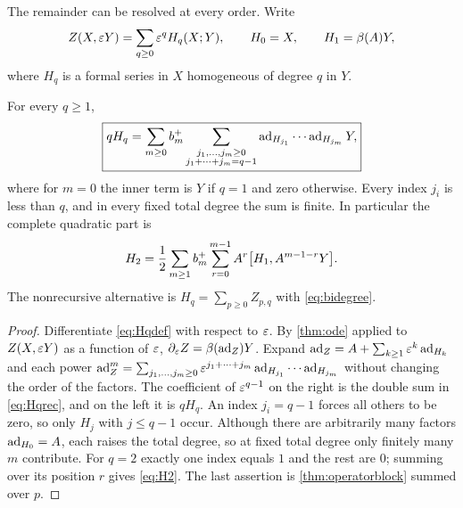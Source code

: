 The remainder can be resolved at every order. Write
\begin{equation}\label{eq:Hqdef}
 Z(X,\varepsilon Y)=\sum_{q\geq0}\varepsilon^qH_q(X;Y),\qquad H_0=X,\qquad H_1=\beta(A)Y,
\end{equation}
where $H_q$ is a formal series in $X$ homogeneous of degree $q$ in $Y$.
\begin{proposition}\label{prop:Hqrec}
For every $q\geq1$,
\begin{equation}\label{eq:Hqrec}
 \boxed{\displaystyle
 qH_q=\sum_{m\geq0}b^{+}_{m}
 \sum_{\substack{j_1,\ldots,j_m\geq0\\j_1+\cdots+j_m=q-1}}
 \operatorname{ad}_{H_{j_1}}\cdots\operatorname{ad}_{H_{j_m}}Y,}
\end{equation}
where for $m=0$ the inner term is $Y$ if $q=1$ and zero otherwise. Every
index $j_i$ is less than $q$, and in every fixed total degree the sum is
finite. In particular the complete quadratic part is
\begin{equation}\label{eq:H2}
 H_2=\frac12\sum_{m\geq1}b^{+}_{m}\sum_{r=0}^{m-1}A^r\bigl[H_1,A^{m-1-r}Y\bigr].
\end{equation}
The nonrecursive alternative is $H_q=\sum_{p\geq0}Z_{p,q}$ with
\eqref{eq:bidegree}.
\end{proposition}
\begin{proof}
Differentiate \eqref{eq:Hqdef} with respect to $\varepsilon$. By
\cref{thm:ode} applied to $Z(X,\varepsilon Y)$ as a function of $\varepsilon$,
$\partial_\varepsilon Z=\beta(\operatorname{ad}_Z)Y$. Expand
$\operatorname{ad}_Z=A+\sum_{k\geq1}\varepsilon^k\operatorname{ad}_{H_k}$ and each power
$\operatorname{ad}_Z^m=\sum_{j_1,\ldots,j_m\geq0}\varepsilon^{j_1+\cdots+j_m}
\operatorname{ad}_{H_{j_1}}\cdots\operatorname{ad}_{H_{j_m}}$ without changing the order of the
factors. The coefficient of $\varepsilon^{q-1}$ on the right is the double sum
in \eqref{eq:Hqrec}, and on the left it is $qH_q$. An index $j_i=q-1$
forces all others to be zero, so only $H_j$ with $j\leq q-1$ occur. Although
there are arbitrarily many factors $\operatorname{ad}_{H_0}=A$, each raises the total
degree, so at fixed total degree only finitely many $m$ contribute. For
$q=2$ exactly one index equals $1$ and the rest are $0$; summing over its
position $r$ gives \eqref{eq:H2}. The last assertion is
\cref{thm:operatorblock} summed over $p$.
\end{proof}

